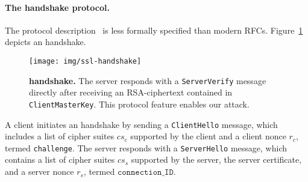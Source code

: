 



\paragraph{The \ssltwo handshake protocol.}
\label{sec:ssl2}
The \ssltwo protocol description~\cite{SSLv2}  is less formally specified than modern RFCs. Figure~\ref{fig:ssl-handshake} depicts an \ssltwo handshake.
%
\begin{figure}
	\texttt{[image: img/ssl-handshake]} 
	\caption{\textbf{\ssltwo handshake.} The server responds with a \texttt{ServerVerify} message directly after receiving an RSA-\PKCS ciphertext contained in \texttt{ClientMasterKey}. This protocol feature enables our attack.}
	\label{fig:ssl-handshake}
\end{figure}
%
A client initiates an \ssltwo handshake by sending a
\texttt{ClientHello} message, which includes a list of cipher
suites $cs_c$ supported by the client and a client nonce $r_c$,
termed \texttt{challenge}.
The server responds with a \texttt{ServerHello} message, which
contains a list of cipher suites $cs_s$ supported by the server,
the server certificate, and a server nonce $r_s$, termed
$\texttt{connection\_ID}$.

